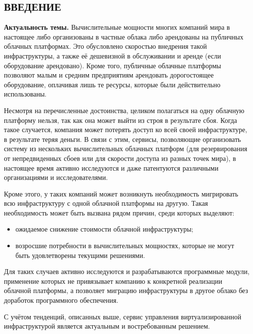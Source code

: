 \begin{center}
\section*{ВВЕДЕНИЕ}
\end{center}
\textbf{Актуальность темы.}
Вычислительные мощности многих компаний мира в настоящее либо организованы в частные облака либо арендованы на публичных облачных платформах. 
Это обусловлено скоростью внедрения такой инфраструктуры, а также её дешевизной в обслуживании и аренде (если оборудование арендовано).
Кроме того, публичные облачные платформы позволяют малым и средним предприятиям арендовать дорогостоящее оборудование, оплачивая лишь те ресурсы, которые были действительно использованы.

Несмотря на перечисленные достоинства, целиком полагаться на одну облачную платформу нельзя, так как она может выйти из строя в результате сбоя.
Когда такое случается, компания может потерять доступ ко всей своей инфраструктуре, в результате теряя деньги.
В связи с этим, сервисы, позволяющие организовать систему из нескольких вычислительных облачных платформ (для резервирования от непредвиденных сбоев или для скорости доступа из разных точек мира), в настоящее время активно исследуются и даже патентуются различными организациями и исследователями.

Кроме этого, у таких компаний может возникнуть необходимость мигрировать всю инфраструктуру с одной облачной платформы на другую.
Такая необходимость может быть вызвана рядом причин, среди которых выделяют:
\begin{itemize}
    \item ожидаемое снижение стоимости облачной инфраструктуры;
    \item возросшие потребности в вычислительных мощностях, которые не могут быть удовлетворены текущими решениями.
\end{itemize}
Для таких случаев активно исследуются и разрабатываются программные модули, применение которых не привязывает компанию к конкретной реализации облачной платформы, а позволяет миграцию инфраструктуры в другое облако без доработок программного обеспечения.

С учётом тенденций, описанных выше, сервис управления виртуализированной инфраструктурой является актуальным и востребованным решением.


